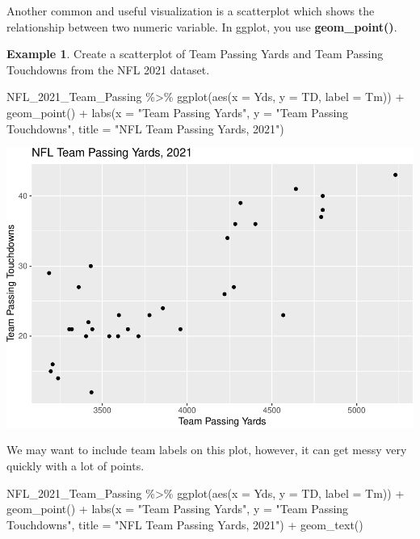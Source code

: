 \documentclass[
  11pt,
]{book}
\newenvironment{Shaded}{\begin{snugshade}}{\end{snugshade}}
\newcommand{\AttributeTok}[1]{\textcolor[rgb]{0.77,0.63,0.00}{#1}}
\newcommand{\FunctionTok}[1]{\textcolor[rgb]{0.00,0.00,0.00}{#1}}
\newcommand{\NormalTok}[1]{#1}
\newcommand{\SpecialCharTok}[1]{\textcolor[rgb]{0.00,0.00,0.00}{#1}}
\newcommand{\StringTok}[1]{\textcolor[rgb]{0.31,0.60,0.02}{#1}}
\theoremstyle{definition}
\theoremstyle{definition}
\newtheorem{example}{Example}[chapter]
\theoremstyle{definition}
\theoremstyle{definition}
\theoremstyle{remark}
\begin{document}
Another common and useful visualization is a scatterplot which shows the relationship between two numeric variable. In ggplot, you use \textbf{geom\_point()}.

\begin{example}
Create a scatterplot of Team Passing Yards and Team Passing Touchdowns from the NFL 2021 dataset.

\begin{Shaded}
\begin{Highlighting}[]
\NormalTok{NFL\_2021\_Team\_Passing }\SpecialCharTok{\%\textgreater{}\%}
    \FunctionTok{ggplot}\NormalTok{(}\FunctionTok{aes}\NormalTok{(}\AttributeTok{x =}\NormalTok{ Yds, }\AttributeTok{y =}\NormalTok{ TD, }\AttributeTok{label =}\NormalTok{ Tm)) }\SpecialCharTok{+} \FunctionTok{geom\_point}\NormalTok{() }\SpecialCharTok{+} \FunctionTok{labs}\NormalTok{(}\AttributeTok{x =} \StringTok{"Team Passing Yards"}\NormalTok{,}
    \AttributeTok{y =} \StringTok{"Team Passing Touchdowns"}\NormalTok{, }\AttributeTok{title =} \StringTok{"NFL Team Passing Yards, 2021"}\NormalTok{)}
\end{Highlighting}
\end{Shaded}

\includegraphics{series_files/figure-latex/scatter1-1.pdf}

We may want to include team labels on this plot, however, it can get messy very quickly with a lot of points.

\begin{Shaded}
\begin{Highlighting}[]
\NormalTok{NFL\_2021\_Team\_Passing }\SpecialCharTok{\%\textgreater{}\%}
    \FunctionTok{ggplot}\NormalTok{(}\FunctionTok{aes}\NormalTok{(}\AttributeTok{x =}\NormalTok{ Yds, }\AttributeTok{y =}\NormalTok{ TD, }\AttributeTok{label =}\NormalTok{ Tm)) }\SpecialCharTok{+} \FunctionTok{geom\_point}\NormalTok{() }\SpecialCharTok{+} \FunctionTok{labs}\NormalTok{(}\AttributeTok{x =} \StringTok{"Team Passing Yards"}\NormalTok{,}
    \AttributeTok{y =} \StringTok{"Team Passing Touchdowns"}\NormalTok{, }\AttributeTok{title =} \StringTok{"NFL Team Passing Yards, 2021"}\NormalTok{) }\SpecialCharTok{+} \FunctionTok{geom\_text}\NormalTok{()}
\end{Highlighting}
\end{Shaded}


\end{example}
\end{document}

